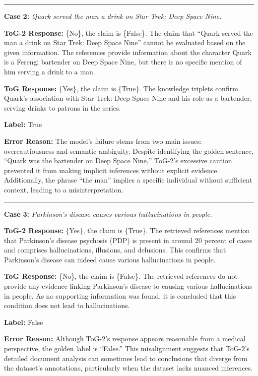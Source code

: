 \documentclass{article} %
\begin{document}
\rule{\textwidth}{0.5pt}

\textbf{Case 2:} \emph{Quark served the man a drink on Star Trek: Deep Space Nine.}

\noindent\textbf{ToG-2 Response:} \{No\}, the claim is \{False\}. The claim that “Quark served the man a drink on Star Trek: Deep Space Nine” cannot be evaluated based on the given information. The references provide information about the character Quark is a Ferengi bartender on Deep Space Nine, but there is no specific mention of him serving a drink to a man.

\noindent\textbf{ToG Response:} \{Yes\}, the claim is \{True\}. The knowledge triplets confirm Quark’s association with Star Trek: Deep Space Nine and his role as a bartender, serving drinks to patrons in the series.

\noindent\textbf{Label:} True

\noindent\textbf{Error Reason:} The model’s failure stems from two main issues: overcautiousness and semantic ambiguity. Despite identifying the golden sentence, “Quark was the bartender on Deep Space Nine,” ToG-$2$’s excessive caution prevented it from making implicit inferences without explicit evidence. Additionally, the phrase “the man” implies a specific individual without sufficient context, leading to a misinterpretation.

\rule{\textwidth}{0.5pt}

\textbf{Case 3:} \emph{Parkinson’s disease causes various hallucinations in people.}

\noindent\textbf{ToG-2 Response:} \{Yes\}, the claim is \{True\}. The retrieved references mention that Parkinson's disease psychosis (PDP) is present in around 20 percent of cases and comprises hallucinations, illusions, and delusions. This confirms that Parkinson's disease can indeed cause various hallucinations in people.

\noindent\textbf{ToG Response:} \{No\}, the claim is \{False\}. The retrieved references do not provide any evidence linking Parkinson's disease to causing various hallucinations in people. As no supporting information was found, it is concluded that this condition does not lead to hallucinations.

\noindent\textbf{Label:} False

\noindent\textbf{Error Reason:} Although ToG-$2$’s response appears reasonable from a medical perspective, the golden label is “False.” This misalignment suggests that ToG-$2$’s detailed document analysis can sometimes lead to conclusions that diverge from the dataset’s annotations, particularly when the dataset lacks nuanced inferences.
\end{document}
